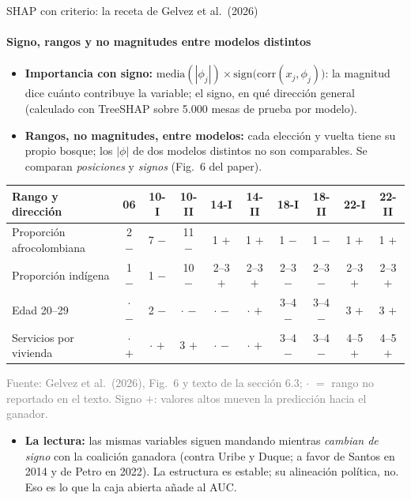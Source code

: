 \documentclass{beamer}
\newcommand{\1}{\mathbb{I}}
\begin{document}
\begin{frame}{SHAP con criterio: la receta de Gelvez et al.\ (2026)}
\framesubtitle{Signo, rangos y no magnitudes entre modelos distintos}
\small
\begin{itemize}\itemsep2pt
  \item \textbf{Importancia con signo:} $\text{media}(|\phi_j|) \times \mathrm{sign}\big(\mathrm{corr}(x_j, \phi_j)\big)$: la magnitud dice cuánto contribuye la variable; el signo, en qué dirección general (calculado con TreeSHAP sobre 5.000 mesas de prueba por modelo). \pause
  \item \textbf{Rangos, no magnitudes, entre modelos:} cada elección y vuelta tiene su propio bosque; los $|\phi|$ de dos modelos distintos no son comparables. Se comparan \emph{posiciones} y \emph{signos} (Fig.\ 6 del paper). \pause
\end{itemize}
\begin{center}
\scriptsize
\setlength{\tabcolsep}{3pt}
\begin{tabular}{lccccccccc}
\hline
Rango y dirección & 06 & 10-I & 10-II & 14-I & 14-II & 18-I & 18-II & 22-I & 22-II \\
\hline
Proporción afrocolombiana & 2 $-$ & 7 $-$ & 11 $-$ & 1 $+$ & 1 $+$ & 1 $-$ & 1 $-$ & 1 $+$ & 1 $+$ \\
Proporción indígena & 1 $-$ & 1 $-$ & 10 $-$ & 2--3 $+$ & 2--3 $+$ & 2--3 $-$ & 2--3 $-$ & 2--3 $+$ & 2--3 $+$ \\
Edad 20--29 & $\cdot$ $-$ & 2 $-$ & $\cdot$ $-$ & $\cdot$ $-$ & $\cdot$ $+$ & 3--4 $-$ & 3--4 $-$ & 3 $+$ & 3 $+$ \\
Servicios por vivienda & $\cdot$ $+$ & $\cdot$ $+$ & 3 $+$ & $\cdot$ $-$ & $\cdot$ $+$ & 3--4 $-$ & 3--4 $-$ & 4--5 $+$ & 4--5 $+$ \\
\hline
\end{tabular}
\end{center}
{\scriptsize\textcolor{gray}{Fuente: Gelvez et al.\ (2026), Fig.\ 6 y texto de la sección 6.3; $\cdot$ $=$ rango no reportado en el texto. Signo $+$: valores altos mueven la predicción hacia el ganador.}}
\pause
\begin{itemize}\itemsep2pt
  \item \textbf{La lectura:} las mismas variables siguen mandando mientras \emph{cambian de signo} con la coalición ganadora (contra Uribe y Duque; a favor de Santos en 2014 y de Petro en 2022). La estructura es estable; su alineación política, no. Eso es lo que la caja abierta añade al AUC.
\end{itemize}
\end{frame}
\end{document}

